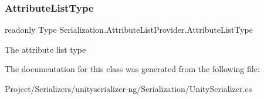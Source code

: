 \subsubsection{\texorpdfstring{Attribute\+List\+Type}{AttributeListType}}
{\footnotesize\ttfamily readonly Type Serialization.\+Attribute\+List\+Provider.\+Attribute\+List\+Type}



The attribute list type 



The documentation for this class was generated from the following file\+:\begin{DoxyCompactItemize}
\item 
Project/\+Serializers/unityserializer-\/ng/\+Serialization/Unity\+Serializer.\+cs\end{DoxyCompactItemize}
